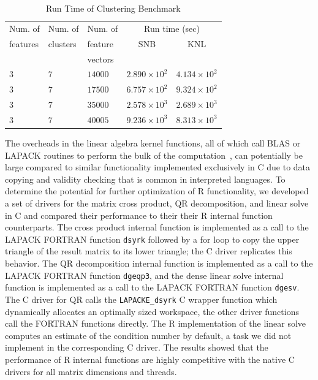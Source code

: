 \begin{table}
  \caption{Run Time of Clustering Benchmark}
  \label{tab:clusterResults}
  \begin{tabular}{lllcc}
    \toprule
    Num. of   & Num. of   & Num. of & \multicolumn{2}{c}{Run time (sec)}\\
    features  & clusters  & feature           & SNB & KNL\\
              &           & vectors           & &\\
    \midrule
    $3$ & $7$ & $14000$ & $2.890\times 10^{2}$ & $4.134\times 10^{2}$ \\ %
    $3$ & $7$ & $17500$ & $6.757\times 10^{2}$ & $9.324\times 10^{2}$ \\ %
    $3$ & $7$ & $35000$ & $2.578\times 10^{3}$ & $2.689\times 10^{3}$ \\ %
    $3$ & $7$ & $40005$ & $9.236\times 10^{3}$ & $8.313\times 10^{3}$ \\ %
    \bottomrule
  \end{tabular}
\end{table}


The overheads in the linear algebra kernel functions, all of which call BLAS or LAPACK
routines to perform the bulk of the computation~\cite{cran:Rmanuals}, can potentially be
large compared to similar functionality implemented exclusively in C due to data copying
and validity checking that is common in interpreted languages. To determine the potential
for further optimization of R functionality, we developed a set of drivers for the matrix
cross product, QR decomposition, and linear solve in C and compared their performance to
their their R internal function counterparts. The cross product internal function is
implemented as a call to the LAPACK FORTRAN function \texttt{dsyrk} followed by a for loop
to copy the upper triangle of the result matrix to its lower triangle; the C driver
replicates this behavior. The QR decomposition internal function is implemented as a call
to the LAPACK FORTRAN function \texttt{dgeqp3}, and the dense linear solve internal
function is implemented as a call to the LAPACK FORTRAN function \texttt{dgesv}. The C
driver for QR calls the \texttt{LAPACKE\_dsyrk} C wrapper function which dynamically
allocates an optimally sized workspace, the other driver functions call the FORTRAN
functions directly. The R implementation of the linear solve computes an estimate of the
condition number by default, a task we did not implement in the corresponding C driver.
The results showed that the performance of R internal functions are highly competitive
with the native C drivers for all matrix dimensions and threads.


